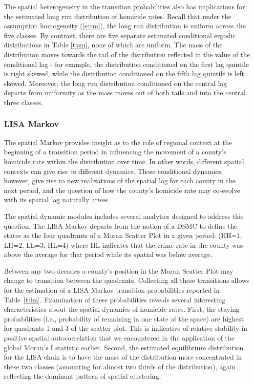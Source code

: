 \documentclass[11pt, titlepage]{article}
\begin{document}
The spatial heterogeneity in the transition probabilities also has
implications for the estimated long run distribution of homicide rates.
Recall that under the assumption homogeneity (\ref{e:cm}), the long run
distribution is uniform across the five classes. By contrast, there are
five separate estimated conditional ergodic distributions in Table
\ref{t:sm},
none of which are uniform. The mass of the distribution moves towards
the tail of the distribution reflected in the value of the conditional
lag - for example, the distribution conditioned on the first lag
quintile is right skewed, while the distribution conditioned on the
fifth lag quintile is left skewed. Moreover, the long run distribution
conditioned on the central lag departs from uniformity as the mass moves
out of both tails and into the central three classes.


\subsubsection{LISA Markov}
The spatial Markov provides insight as to the role of regional context
at the beginning of a transition period in influencing the movement of a
county's homicide rate within the distribution over time. In other
words, different spatial contexts can give rise to different dynamics.
Those conditional dynamics, however, give rise to new realizations of
the spatial lag for each county in the next period, and the question of
how the county's homicide rate may co-evolve with its spatial lag
naturally arises.

The spatial dynamic modules includes several analytics designed to
address this question. The LISA Markov departs from the notion of a DSMC
to define the states as the four quadrants of a Moran Scatter Plot
\citep{Anselin:1996ze} in a given period: (HH=1, LH=2, LL=3, HL=4) where
HL indicates that the crime rate in the county was above the average for
that period while its spatial was below average.

Between any two decades a county's position in the Moran Scatter Plot
may change to transition between the quadrants. Collecting all these
transitions allows for the estimation of a LISA Markov transition
probabilities reported in
Table~\ref{t:lm}.  Examination of these probabilities reveals several
interesting characteristics about the spatial dynamics of homicide rates.
First, the staying probabilities (i.e., probability of remaining in one
state of the space) are highest for quadrants 1 and 3 of the scatter
plot. This is indicative of relative stability in positive spatial
autocorrelation that we encountered in the application of the global
Moran's I statistic earlier. Second, the estimated equilibrium
distribution for the LISA chain is to have the mass of the distribution
more concentrated in these two classes (amounting for almost two thirds
of the distribution), again reflecting the dominant pattern of spatial
clustering.
\end{document}
